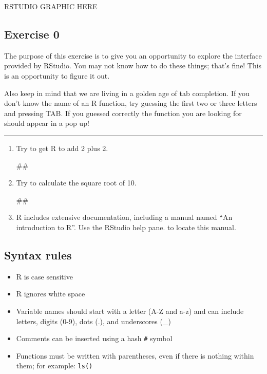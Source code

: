 \documentclass[]{book}
\newenvironment{Shaded}{\begin{snugshade}}{\end{snugshade}}
\newcommand{\NormalTok}[1]{#1}
\providecommand{\tightlist}{%
  \setlength{\itemsep}{0pt}\setlength{\parskip}{0pt}}
\begin{document}
RSTUDIO GRAPHIC HERE

\subsection{Exercise 0}\label{exercise-0}

The purpose of this exercise is to give you an opportunity to explore
the interface provided by RStudio. You may not know how to do these
things; that's fine! This is an opportunity to figure it out.

Also keep in mind that we are living in a golden age of tab completion.
If you don't know the name of an R function, try guessing the first two
or three letters and pressing TAB. If you guessed correctly the function
you are looking for should appear in a pop up!

\begin{center}\rule{0.5\linewidth}{\linethickness}\end{center}

\begin{enumerate}
\def\labelenumi{\arabic{enumi}.}
\item
  Try to get R to add 2 plus 2.

\begin{Shaded}
\begin{Highlighting}[]
\NormalTok{##}
\end{Highlighting}
\end{Shaded}
\item
  Try to calculate the square root of 10.

\begin{Shaded}
\begin{Highlighting}[]
\NormalTok{##}
\end{Highlighting}
\end{Shaded}
\item
  R includes extensive documentation, including a manual named ``An
  introduction to R''. Use the RStudio help pane. to locate this manual.
\end{enumerate}

\subsection{Syntax rules}\label{syntax-rules}

\begin{itemize}
\tightlist
\item
  R is case sensitive
\item
  R ignores white space
\item
  Variable names should start with a letter (A-Z and a-z) and can
  include letters, digits (0-9), dots (.), and underscores (\_)
\item
  Comments can be inserted using a hash \texttt{\#} symbol
\item
  Functions must be written with parentheses, even if there is nothing
  within them; for example: \texttt{ls()}
\end{itemize}
\end{document}
